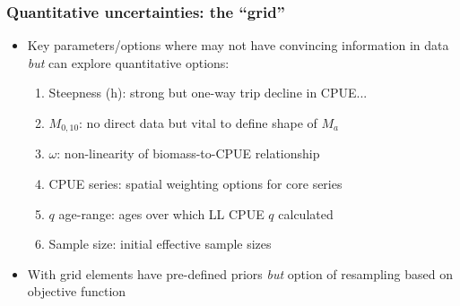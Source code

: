 \documentclass{beamer}
\begin{document}
\begin{frame}
\frametitle{Quantitative uncertainties: the ``grid''}
\begin{itemize}
    \item Key parameters/options where may not have convincing information in data \emph{but} can explore quantitative options:
        \begin{enumerate}
            \item {\color{orange} Steepness (h)}: strong but one-way trip decline in CPUE...
            \item {\color{orange}$M_{0,10}$}: no direct data but vital to define shape of $M_a$
            \item {\color{orange} $\omega$}: non-linearity of biomass-to-CPUE relationship
            \item {\color{orange} CPUE series}: spatial weighting options for core series
            \item {\color{orange} $q$ age-range}: ages over which LL CPUE $q$ calculated
            \item {\color{orange} Sample size}: initial effective sample sizes 
        \end{enumerate}
    \item With grid elements have pre-defined priors \emph{but} option of resampling based on objective function
\end{itemize}
\end{frame}
\end{document}
